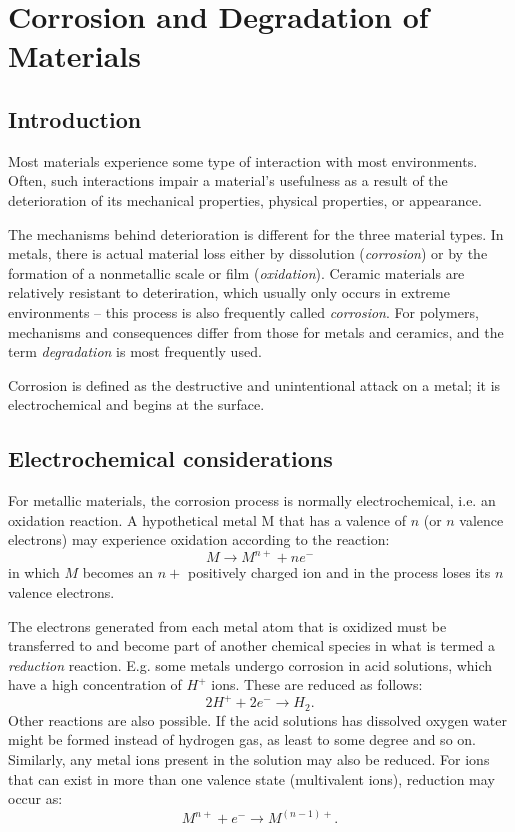 
\section{Corrosion and Degradation of Materials}

\subsection{Introduction}
Most materials experience some type of interaction with most environments. Often, such interactions impair a material's usefulness as a result of the deterioration of its mechanical properties, physical properties, or appearance.

The mechanisms behind deterioration is different for the three material types. In metals, there is actual material loss either by dissolution (\textit{corrosion}) or by the formation of a nonmetallic scale or film (\textit{oxidation}). Ceramic materials are relatively resistant to deteriration, which usually only occurs in extreme environments -- this process is also frequently called \textit{corrosion}. For polymers, mechanisms and consequences differ from those for metals and ceramics, and the term \textit{degradation} is most frequently used. 

\begin{definition}[Corrosion]
  Corrosion is defined as the destructive and unintentional attack on a metal; it is electrochemical and begins at the surface.
\end{definition}

\subsection{Electrochemical considerations}
For metallic materials, the corrosion process is normally electrochemical, i.e. an oxidation reaction. A hypothetical metal M that has a valence of $n$ (or $n$ valence electrons) may experience oxidation according to the reaction:
\[ 
M \rightarrow M^{n+} + ne^{-}
\]
in which $M$ becomes an $n+$ positively charged ion and in the process loses its $n$ valence electrons. 

The electrons generated from each metal atom that is oxidized must be transferred to and become part of another chemical species in what is termed a \textit{reduction} reaction. E.g. some metals undergo corrosion in acid solutions, which have a high concentration of $H^{+}$ ions. These are reduced as follows:
\[ 
2H^{+} + 2e^{-} \rightarrow H_2
.\]
Other reactions are also possible. If the acid solutions has dissolved oxygen water might be formed instead of hydrogen gas, as least to some degree and so on. Similarly, any metal ions present in the solution may also be reduced. For ions that can exist in more than one valence state (multivalent ions), reduction may occur as:
\[ 
M^{n+} + e^{-} \rightarrow M^{(n-1)+}
.\]

